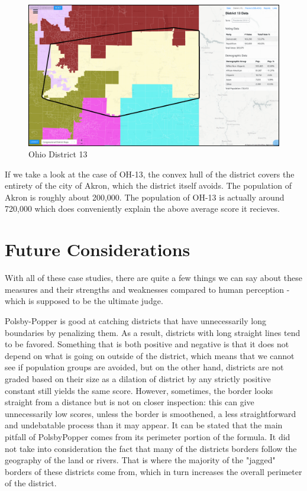 \documentclass[letterpaper]{article}
\begin{document}
\begin{figure}[H]
	\includegraphics[width=\linewidth]{./figures/OH-13-ConvexHull.png}
	\caption{Ohio District 13}
	\label{fig:oh13ch}
\end{figure}

If we take a look at the case of OH-13, the convex hull of the district covers the entirety of the city of Akron, which the district itself avoids. The population of Akron is roughly about 200,000. The population of OH-13 is actually around 720,000 which does conveniently explain the above average score it recieves.

\section{Future Considerations}
With all of these case studies, there are quite a few things we can say about these measures and their strengths and weaknesses compared to human perception - which is supposed to be the ultimate judge.

Polsby-Popper is good at catching districts that have unnecessarily long boundaries by penalizing them. As a result, districts with long straight lines tend to be favored. Something that is both positive and negative is that it does not depend on what is going on outside of the district, which means that we cannot see if population groups are avoided, but on the other hand, districts are not graded based on their size as a dilation of district by any strictly positive constant still yields the same score. However, sometimes, the border looks straight from a distance but is not on closer inspection: this can give unnecessarily low scores, unless the border is smoothened, a less straightforward and undebatable process than it may appear. It can be stated that the main pitfall of PolsbyPopper comes from its perimeter portion of the formula. It did not take into consideration the fact that many of the districts borders follow the geography of the land or rivers. That is where the majority of the "jagged" borders of these districts come from, which in turn increases the overall perimeter of the district.
\end{document}
